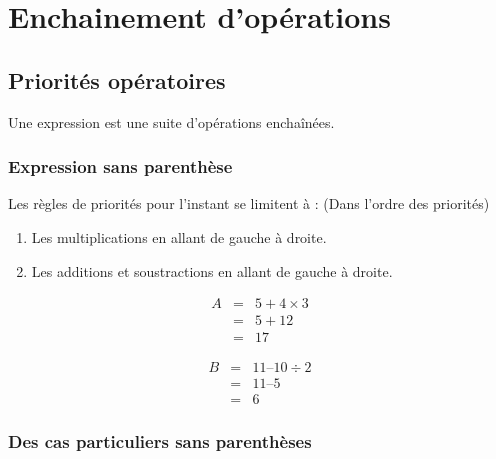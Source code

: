 \documentclass[a4paper,10pt]{report}
\begin{document}
\newpage
\setcounter{chapter}{2}
\chapter{Enchainement d'opérations}

\section{Priorités opératoires}

Une expression est une suite d'opérations enchaînées.
	
\subsection{Expression sans parenthèse}

\begin{prop}
Les règles de priorités pour l'instant se limitent à : (Dans l'ordre des priorités)
\begin{enumerate}
	\item Les multiplications en allant de gauche à droite.
	\item Les additions et soustractions en allant de gauche à droite.
\end{enumerate}
\end{prop}
 
\begin{ex}

\vspace{-1cm} \hspace{3cm}
\begin{minipage}{6cm}
\begin{eqnarray*}
A &=& 5 + 4 \times 3 \\
&=& 5 + 12 \\
&=& 17
\end{eqnarray*}
\end{minipage}
\begin{minipage}{6cm}
\begin{eqnarray*}
B &=& 11 – 10 \div 2\\
&=& 11 – 5\\
&=& 6
\end{eqnarray*}
\end{minipage}
\end{ex}
 
\subsection{Des cas particuliers sans parenthèses}
\end{document}
